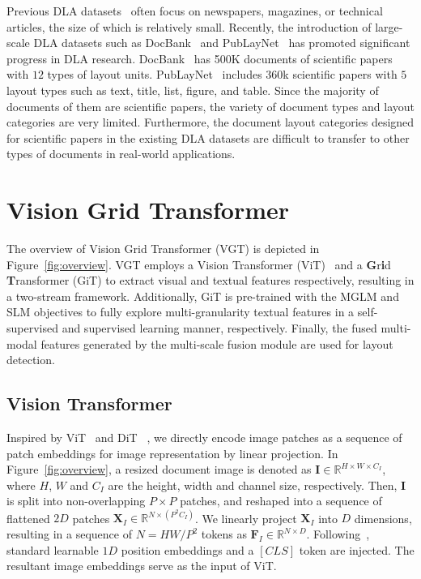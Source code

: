 \documentclass[10pt,twocolumn,letterpaper]{article}
\begin{document}
Previous DLA datasets~\cite{AntonacopoulosBPP09,ClausnerPPA15,yang2017learning} often focus on newspapers, magazines, or technical articles, the size of which is relatively small. 
Recently, the introduction of large-scale DLA datasets such as DocBank~\cite{li2020docbank} and PubLayNet~\cite{zhong2019publaynet} has promoted significant progress in DLA research.
DocBank~\cite{li2020docbank} has 500K documents of scientific papers with $12$ types of layout units.
PubLayNet~\cite{zhong2019publaynet} includes 360k scientific papers with $5$ layout types such as text, title, list, figure, and table.
Since the majority of documents of them are scientific papers,
the variety of document types and layout categories are very limited.
Furthermore, the document layout categories designed for scientific papers in the existing DLA datasets are difficult to transfer to other types of documents in real-world applications.



\section{Vision Grid Transformer}

The overview of Vision Grid Transformer (VGT) is depicted in Figure~\ref{fig:overview}.
VGT employs a Vision Transformer (ViT)~\cite{vit} and a \textbf{G}r\textbf{i}d \textbf{T}ransformer (GiT) to extract visual and textual features respectively, resulting in a two-stream framework.
Additionally,  GiT is pre-trained with the MGLM and SLM objectives to fully explore multi-granularity textual features in a self-supervised and supervised learning manner, respectively.
Finally, the fused multi-modal features generated by the multi-scale fusion module are used for layout detection.


\subsection{Vision Transformer}
\label{sec:Image}
Inspired by ViT~\cite{vit} and DiT~\cite{li2022dit} , 
we directly encode image patches as a sequence of patch embeddings for image representation by linear projection.
In Figure~\ref{fig:overview}, a resized document image is denoted as $\mathbf{I} \in  \mathbb{R}^{H \times W \times C_{I}} $,
where $H$, $W$ and $C_{I}$ are the height, width and channel size, respectively.
Then, $\mathbf{I}$ is split into non-overlapping $P \times P$  patches, and reshaped into a sequence of flattened $2D$ patches $ \mathbf{X}_I \in  \mathbb{R}^{N \times (P^2  C_{I})} $.
We linearly project $ \mathbf{X}_I$ into $D$ dimensions, resulting in a sequence of $N = HW/P^2$ tokens as $ \mathbf{F}_I \in  \mathbb{R}^{N \times D} $.
Following~\cite{vit}, standard learnable $1D$ position embeddings and a $[CLS]$ token are injected.
The resultant image embeddings serve as the input of ViT. 
\end{document}
